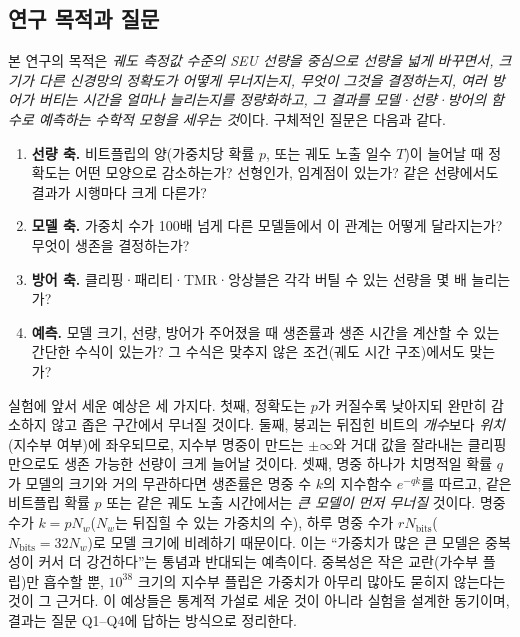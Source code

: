 \documentclass[11pt,a4paper]{article}
\begin{document}
\subsection{연구 목적과 질문}
\label{sec:questions}
본 연구의 목적은 \emph{궤도 측정값 수준의 SEU 선량을 중심으로 선량을 넓게 바꾸면서, 크기가 다른 신경망의 정확도가 어떻게 무너지는지, 무엇이 그것을 결정하는지, 여러 방어가 버티는 시간을 얼마나 늘리는지를 정량화하고, 그 결과를 모델·선량·방어의 함수로 예측하는 수학적 모형을 세우는 것}이다. 구체적인 질문은 다음과 같다.
\begin{enumerate}[label=\textbf{Q\arabic*.},leftmargin=*]
  \item \textbf{선량 축.} 비트플립의 양(가중치당 확률 $p$, 또는 궤도 노출 일수 $T$)이 늘어날 때 정확도는 어떤 모양으로 감소하는가? 선형인가, 임계점이 있는가? 같은 선량에서도 결과가 시행마다 크게 다른가?
  \item \textbf{모델 축.} 가중치 수가 100배 넘게 다른 모델들에서 이 관계는 어떻게 달라지는가? 무엇이 생존을 결정하는가?
  \item \textbf{방어 축.} 클리핑·패리티·TMR·앙상블은 각각 버틸 수 있는 선량을 몇 배 늘리는가?
  \item \textbf{예측.} 모델 크기, 선량, 방어가 주어졌을 때 생존률과 생존 시간을 계산할 수 있는 간단한 수식이 있는가? 그 수식은 맞추지 않은 조건(궤도 시간 구조)에서도 맞는가?
\end{enumerate}
실험에 앞서 세운 예상은 세 가지다. 첫째, 정확도는 $p$가 커질수록 낮아지되 완만히 감소하지 않고 좁은 구간에서 무너질 것이다. 둘째, 붕괴는 뒤집힌 비트의 \emph{개수}보다 \emph{위치}(지수부 여부)에 좌우되므로, 지수부 명중이 만드는 $\pm\infty$와 거대 값을 잘라내는 클리핑만으로도 생존 가능한 선량이 크게 늘어날 것이다. 셋째, 명중 하나가 치명적일 확률 $q$가 모델의 크기와 거의 무관하다면 생존률은 명중 수 $k$의 지수함수 $e^{-qk}$를 따르고, 같은 비트플립 확률 $p$ 또는 같은 궤도 노출 시간에서는 \emph{큰 모델이 먼저 무너질} 것이다. 명중 수가 $k=pN_w$($N_w$는 뒤집힐 수 있는 가중치의 수), 하루 명중 수가 $rN_{\mathrm{bits}}$($N_{\mathrm{bits}}=32N_w$)로 모델 크기에 비례하기 때문이다. 이는 ``가중치가 많은 큰 모델은 중복성이 커서 더 강건하다''는 통념과 반대되는 예측이다. 중복성은 작은 교란(가수부 플립)만 흡수할 뿐, $10^{38}$ 크기의 지수부 플립은 가중치가 아무리 많아도 묻히지 않는다는 것이 그 근거다. 이 예상들은 통계적 가설로 세운 것이 아니라 실험을 설계한 동기이며, 결과는 질문 Q1--Q4에 답하는 방식으로 정리한다.
\end{document}
